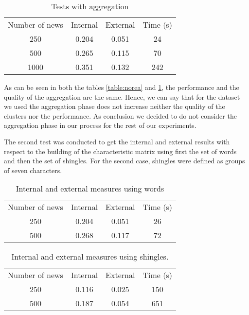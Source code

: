 \documentclass{acm_proc_article-sp}
\begin{document}
\begin{table}[!ht]
\centering
\label{table:sirea}
\begin{tabular}{cccc}
Number of news & Internal & External & Time (s) \\
250            & 0.204    & 0.051    & 24       \\
500            & 0.265    & 0.115    & 70       \\
1000           & 0.351    & 0.132    & 242     
\end{tabular}
\caption{Tests with aggregation}
\end{table}

As can be seen in both the tables \ref{table:norea} and \ref{table:sirea}, the performance and the quality of the aggregation are the same. Hence, we can say that for the dataset we used the aggregation phase does not increase neither the quality of the clusters nor the performance. As conclusion we decided to do not consider the aggregation phase in our process for the rest of our experiments.


The second test was conducted to get the internal and external results with respect to the building of the characteristic matrix using first the set of words and then the set of shingles. For the second case, shingles were defined as groups of seven characters.

\begin{table}[h]
\centering
\label{table:matrix_words}
\caption{Internal and external measures using words}
\label{my-label}
\begin{tabular}{cccc}
Number of news & Internal & External & Time (s) \\
250            & 0.204    & 0.051    & 26       \\
500            & 0.268    & 0.117    & 72       \\
\end{tabular}
\end{table}

\begin{table}[h]
\centering
\caption{Internal and external measures using shingles.}
\label{table:matrix_shingles}
\begin{tabular}{cccc}
Number of news & Internal & External & Time (s) \\
250            & 0.116    & 0.025    & 150      \\
500            & 0.187    & 0.054    & 651      \\
\end{tabular}
\end{table}
\end{document}
